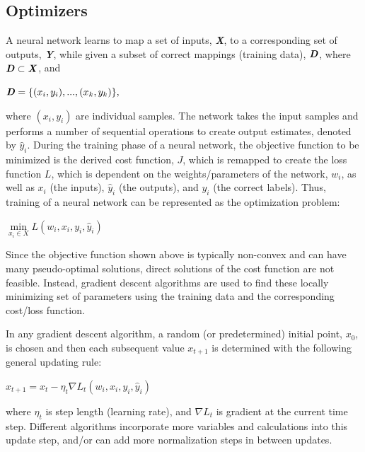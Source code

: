 \subsection{Optimizers}

A neural network learns to map a set of inputs, \textbf{\textit{X}}, to a corresponding set of outputs, \textbf{\textit{Y}}, while given a subset of correct mappings (training data), $\textbf{\textit{D}}$, where $\textbf{\textit{D}} \subset \textbf{\textit{X}}$, and
\begin{center}
$\textbf{\textit{D}} = \{(x_i,y_i),...,(x_k,y_k)\},$
\end{center}
where $(x_i,y_i)$ are individual samples. The network takes the input samples and performs a number of sequential operations to create output estimates, denoted by $\hat y_i$. During the training phase of a neural network, the objective function to be minimized is the derived cost function, $J$, which is remapped to create the loss function $L$, which is dependent on the weights/parameters of the network, $w_i$, as well as $x_i$ (the inputs), $\hat y_i$ (the outputs), and $y_i$ (the correct labels). Thus, training of a neural network can be represented as the optimization problem:

\begin{center}
$\min\limits_{x_i \in X} L(w_i,x_i,y_i,\hat y_i)$
\end{center}

Since the objective function shown above is typically non-convex and can have many pseudo-optimal solutions, direct solutions of the cost function are not feasible. Instead, gradient descent algorithms are used to find these locally minimizing set of parameters using the training data and the corresponding cost/loss function.

In any gradient descent algorithm, a random (or predetermined) initial point, $x_0$, is chosen and then each subsequent value $x_{t+1}$ is determined with the following general updating rule:
\begin{center}
$x_{t+1} = x_t - \eta_t \nabla L_t(w_i,x_i,y_i,\hat y_i) $
\end{center} 
where $\eta_t$ is step length (learning rate), and $\nabla L_t$ is gradient at the current time step. Different algorithms incorporate more variables and calculations into this update step, and/or can add more normalization steps in between updates.

